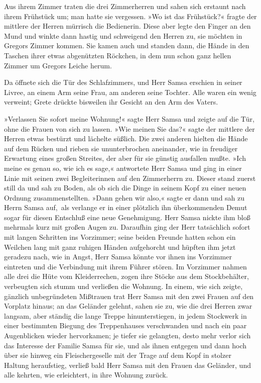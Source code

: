 Aus ihrem Zimmer traten die drei Zimmerherren und sahen sich erstaunt
nach ihrem Frühstück um; man hatte sie vergessen. »Wo ist das
Frühstück?« fragte der mittlere der Herren mürrisch die Bedienerin.
Diese aber legte den Finger an den Mund und winkte dann hastig und
schweigend den Herren zu, sie möchten in Gregors Zimmer kommen. Sie
kamen auch und standen dann, die Hände in den Taschen ihrer etwas
abgenützten Röckchen, in dem nun schon ganz hellen Zimmer um Gregors
Leiche herum.

Da öffnete sich die Tür des Schlafzimmers, und Herr Samsa erschien in
seiner Livree, an einem Arm seine Frau, am anderen seine Tochter. Alle
waren ein wenig verweint; Grete drückte bisweilen ihr Gesicht an den Arm
des Vaters.

»Verlassen Sie sofort meine Wohnung!« sagte Herr Samsa und zeigte auf
die Tür, ohne die Frauen von sich zu lassen. »Wie meinen Sie das?« sagte
der mittlere der Herren etwas bestürzt und lächelte süßlich. Die zwei
anderen hielten die Hände auf dem Rücken und rieben sie ununterbrochen
aneinander, wie in freudiger Erwartung eines großen Streites, der aber
für sie günstig ausfallen mußte. »Ich meine es genau so, wie ich es
sage,« antwortete Herr Samsa und ging in einer Linie mit seinen zwei
Begleiterinnen auf den Zimmerherrn zu. Dieser stand zuerst still da und
sah zu Boden, als ob sich die Dinge in seinem Kopf zu einer neuen
Ordnung zusammenstellten. »Dann gehen wir also,« sagte er dann und sah
zu Herrn Samsa auf,\est\ als verlange er in einer plötzlich ihn überkommenden
Demut sogar für diesen Entschluß eine neue Genehmigung. Herr Samsa
nickte ihm bloß mehrmals kurz mit großen Augen zu. Daraufhin ging der
Herr tatsächlich sofort mit langen Schritten ins Vorzimmer; seine beiden
Freunde hatten schon ein Weilchen lang mit ganz ruhigen Händen
aufgehorcht und hüpften ihm jetzt geradezu nach, wie in Angst, Herr
Samsa könnte vor ihnen ins Vorzimmer eintreten und die Verbindung mit
ihrem Führer stören. Im Vorzimmer nahmen alle drei die Hüte vom
Kleiderrechen, zogen ihre Stöcke aus dem Stockbehälter, verbeugten sich
stumm und verließen die Wohnung. In einem, wie sich zeigte, gänzlich
unbegründeten Mißtrauen trat Herr Samsa mit den zwei Frauen auf den
Vorplatz hinaus; an das Geländer gelehnt, sahen sie zu, wie die drei
Herren zwar langsam, aber ständig die lange Treppe hinunterstiegen, in
jedem Stockwerk in einer bestimmten Biegung des Treppenhauses
verschwanden und nach ein paar Augenblicken wieder hervorkamen; je
tiefer sie gelangten, desto mehr verlor sich das Interesse der Familie
Samsa für sie, und als ihnen entgegen und dann hoch über sie hinweg ein
Fleischergeselle mit der Trage auf dem Kopf in stolzer Haltung
heraufstieg, verließ bald Herr Samsa mit den Frauen das Geländer, und
alle kehrten, wie erleichtert, in ihre Wohnung zurück.

